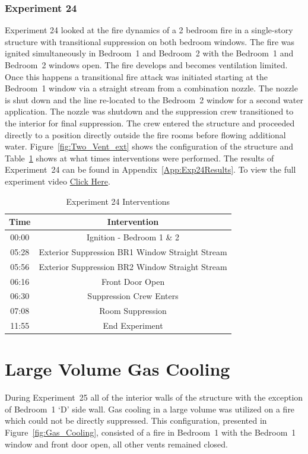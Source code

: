 \documentclass[12pt,oneside]{book}
\begin{document}
\subsubsection{Experiment 24}
Experiment 24 looked at the fire dynamics of a 2 bedroom fire in a single-story structure with transitional suppression on both bedroom windows. The fire was ignited simultaneously in Bedroom~1 and Bedroom~2 with the Bedroom~1 and Bedroom~2 windows open. The fire develops and becomes ventilation limited. Once this happens a transitional fire attack was initiated starting at the Bedroom~1 window via a straight stream from a combination nozzle. The nozzle is shut down and the line re-located to the Bedroom~2 window for a second water application. The nozzle was shutdown and the suppression crew transitioned to the interior for final suppression. The crew entered the structure and proceeded directly to a position directly outside the fire rooms before flowing additional water. Figure~\ref{fig:Two_Vent_ext} shows the configuration of the structure and Table~\ref{Table:Exp24Interventions} shows at what times interventions were performed. The results of Experiment~24 can be found in Appendix~\ref{App:Exp24Results}. To view the full experiment video \href{https://player.vimeo.com/video/170499626?autoplay=1}{Click Here}.

\begin{table}[H]
	\centering
	\caption{Experiment 24 Interventions}
	\begin{tabular}{|c|c|} 
		\hline
		Time & Intervention \\ \hline \hline
		00:00 & Ignition - Bedroom 1 \& 2 \\ \hline
		05:28 & Exterior Suppression BR1 Window Straight Stream \\ \hline
		05:56 & Exterior Suppression BR2 Window Straight Stream \\ \hline		
		06:16 & Front Door Open \\ \hline
		06:30 & Suppression Crew Enters\\ \hline
		07:08 & Room Suppression \\ \hline 
		11:55 & End Experiment\\ \hline
	\end{tabular}
	\label{Table:Exp24Interventions}
\end{table}

\clearpage

\section{Large Volume Gas Cooling}
During Experiment~25 all of the interior walls of the structure with the exception of Bedroom~1 `D' side wall. Gas cooling in a large volume was utilized on a fire which could not be directly suppressed. This configuration, presented in Figure~\ref{fig:Gas_Cooling}, consisted of a fire in Bedroom~1 with the Bedroom~1 window and front door open, all other vents remained closed.  
\end{document}
